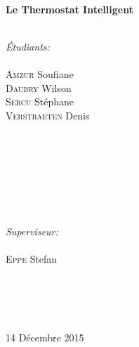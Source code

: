 \documentclass[11pt,a4paper,11pt]{report}
\begin{document}
\begin{titlepage}
\HRule \\[1cm]
{ \huge \bfseries \og Le Thermostat Intelligent \fg}\\[1cm] %
\HRule \\[2cm]
 

\begin{minipage}{0.4\textwidth}
\begin{flushleft} \large
\emph{Étudiants:}\\
\emph{} \\
\textsc{Amzur} Soufiane\\
\textsc{Daubry} Wilson\\
\textsc{Sercu} Stéphane\\
\textsc{Verstraeten} Denis\\ 
\end{flushleft}
\end{minipage}
~
\begin{minipage}{0.4\textwidth}
\begin{flushright} \large
\emph{} \\
\emph{} \\ %
\emph{} \\
\emph{} \\
\emph{} \\
\emph{Superviseur:} \\
\emph{} \\
\textsc{Eppe} Stefan \\ %
\vspace{2.0cm}
\emph{} \\
\emph{} \\
\textsc{} \\ %
\end{flushright}
\end{minipage}\\[4cm]%



{\large 14 Décembre 2015}\\[0cm] %

\vfill %

\end{titlepage}
\end{document}
